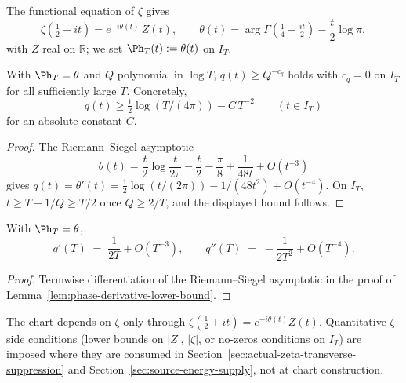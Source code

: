 \begin{remark}[Identification \(\Ph_T = \theta\)]
\label{rem:phase-chart-identification}
The functional equation of \(\zeta\) gives
\[
\zeta(\tfrac12 + it) = e^{-i\theta(t)}\, Z(t),
\qquad
\theta(t) = \arg\Gamma\!\left(\tfrac14 + \tfrac{it}{2}\right) - \frac{t}{2}\log\pi,
\]
with \(Z\) real on \(\mathbb R\); we set \(\Ph_T(t) := \theta(t)\) on
\(I_T\).
\end{remark}

\begin{lemma}
\label{lem:phase-derivative-lower-bound}
With \(\Ph_T = \theta\) and \(Q\) polynomial in \(\log T\),
\(q(t) \ge Q^{-c_q}\) holds with \(c_q = 0\) on \(I_T\) for all
sufficiently large \(T\).  Concretely,
\[
q(t) \ge \tfrac12 \log(T/(4\pi)) - C\,T^{-2}
\qquad (t \in I_T)
\]
for an absolute constant \(C\).
\end{lemma}

\begin{proof}
The Riemann--Siegel asymptotic
\cite{Edwards2001,Titchmarsh1986}
\[
\theta(t) = \frac{t}{2}\log\frac{t}{2\pi} - \frac{t}{2} - \frac{\pi}{8}
          + \frac{1}{48 t} + O(t^{-3})
\]
gives \(q(t) = \theta'(t) = \tfrac12\log(t/(2\pi)) - 1/(48 t^2) +
O(t^{-4})\).  On \(I_T\), \(t \ge T - 1/Q \ge T/2\) once
\(Q \ge 2/T\), and the displayed bound follows.
\end{proof}

\begin{lemma}
\label{lem:phase-derivative-upper-bounds}
With \(\Ph_T = \theta\),
\[
q'(T) \;=\; \frac{1}{2T} + O(T^{-3}),\qquad
q''(T) \;=\; -\frac{1}{2T^2} + O(T^{-4}).
\]
\end{lemma}

\begin{proof}
Termwise differentiation of the Riemann--Siegel asymptotic in the
proof of Lemma~\ref{lem:phase-derivative-lower-bound}.
\end{proof}

\begin{remark}
\label{rem:chart-regularity-zeta-side}
The chart depends on \(\zeta\) only through
\(\zeta(\tfrac12 + it) = e^{-i\theta(t)} Z(t)\).  Quantitative
\(\zeta\)-side conditions (lower bounds on \(|Z|\), \(|\zeta|\), or
no-zeros conditions on \(I_T\)) are imposed where they are consumed
in
Section~\ref{sec:actual-zeta-transverse-suppression} and
Section~\ref{sec:source-energy-supply}, not at chart construction.
\end{remark}

